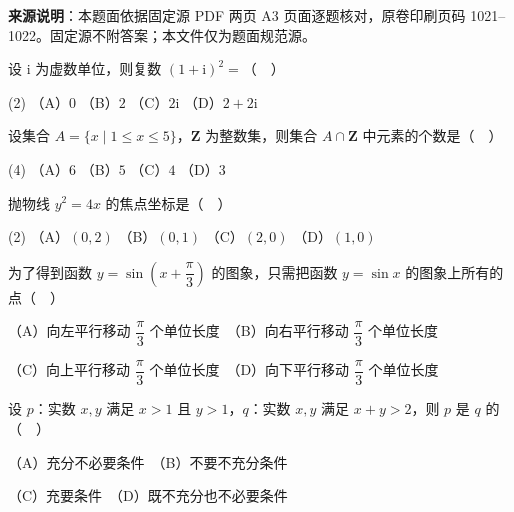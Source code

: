 


\begin{gktip}
\textbf{来源说明}：本题面依据固定源 PDF 两页 A3 页面逐题核对，原卷印刷页码 1021–1022。固定源不附答案；本文件仅为题面规范源。
\end{gktip}


\begin{question}
设 \(\mathrm{i}\) 为虚数单位，则复数 \((1+\mathrm{i})^{2}=\)（　）

\begin{gkopts}(2)
\task （A）\(0\)
\task （B）\(2\)
\task （C）\(2\mathrm{i}\)
\task （D）\(2+2\mathrm{i}\)
\end{gkopts}

\end{question}
\begin{question}
设集合 \(A=\{x\mid 1\leqslant x\leqslant 5\}\)，\(\mathbf{Z}\) 为整数集，则集合 \(A\cap\mathbf{Z}\) 中元素的个数是（　）

\begin{gkopts}(4)
\task （A）\(6\)
\task （B）\(5\)
\task （C）\(4\)
\task （D）\(3\)
\end{gkopts}

\end{question}
\begin{question}
抛物线 \(y^{2}=4x\) 的焦点坐标是（　）

\begin{gkopts}(2)
\task （A）\((0,2)\)
\task （B）\((0,1)\)
\task （C）\((2,0)\)
\task （D）\((1,0)\)
\end{gkopts}

\end{question}
\begin{question}
为了得到函数 \(y=\sin\left(x+\dfrac{\pi}{3}\right)\) 的图象，只需把函数 \(y=\sin x\) 的图象上所有的点（　）

（A）向左平行移动 \(\dfrac{\pi}{3}\) 个单位长度　（B）向右平行移动 \(\dfrac{\pi}{3}\) 个单位长度

（C）向上平行移动 \(\dfrac{\pi}{3}\) 个单位长度　（D）向下平行移动 \(\dfrac{\pi}{3}\) 个单位长度

\end{question}
\begin{question}
设 \(p\)：实数 \(x,y\) 满足 \(x>1\) 且 \(y>1\)，\(q\)：实数 \(x,y\) 满足 \(x+y>2\)，则 \(p\) 是 \(q\) 的（　）

（A）充分不必要条件　（B）不要不充分条件

（C）充要条件　（D）既不充分也不必要条件

\end{question}
